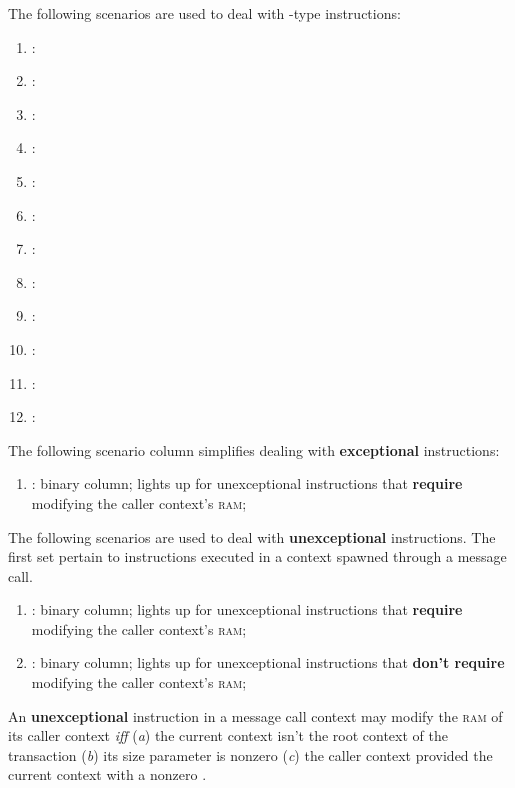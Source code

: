 The following scenarios are used to deal with -type instructions:
\begin{enumerate}[resume]
	\item \scenCreateException:
	\item \scenCreateAbort:
	\item \scenCreateFCondHasCodeWontRevert:
	\item \scenCreateFCondHasCodeWillRevert:
	\item \scenCreateFCondHasNonceWontRevert:
	\item \scenCreateFCondHasNonceWillRevert:
	\item \scenCreateWithInitCodeCurrWontRevertChildFailure:
	\item \scenCreateWithInitCodeCurrWontRevertChildSuccess:
	\item \scenCreateWithInitCodeCurrWillRevertChildFailure:
	\item \scenCreateWithInitCodeCurrWillRevertChildSuccess:
	\item \scenCreateSansInitCodeCurrWontRevert:
	\item \scenCreateSansInitCodeCurrWillRevert:
\end{enumerate}

The following scenario column simplifies dealing with \textbf{exceptional}  instructions: 
\begin{enumerate}[resume]
	\item \scenReturnException:
		binary column;
		lights up for unexceptional  instructions that \textbf{require} modifying the caller context's \textsc{ram};
\end{enumerate}
The following scenarios are used to deal with \textbf{unexceptional}  instructions.
The first set pertain to  instructions executed in a context spawned through a message call.
\begin{enumerate}[resume]
	\item \scenReturnFromMessageCallWillTouchRam:
		binary column;
		lights up for unexceptional  instructions that \textbf{require} modifying the caller context's \textsc{ram};
	\item \scenReturnFromMessageCallWontTouchRam:
		binary column;
		lights up for unexceptional  instructions that \textbf{don't require} modifying the caller context's \textsc{ram};
\end{enumerate}
\saNote{} An \textbf{unexceptional}  instruction in a message call context may modify the \textsc{ram} of its caller context \emph{iff}
(\emph{a}) the current context isn't the root context of the transaction
(\emph{b}) its size parameter is nonzero
(\emph{c}) the caller context provided the current context with a nonzero \rac{}.


